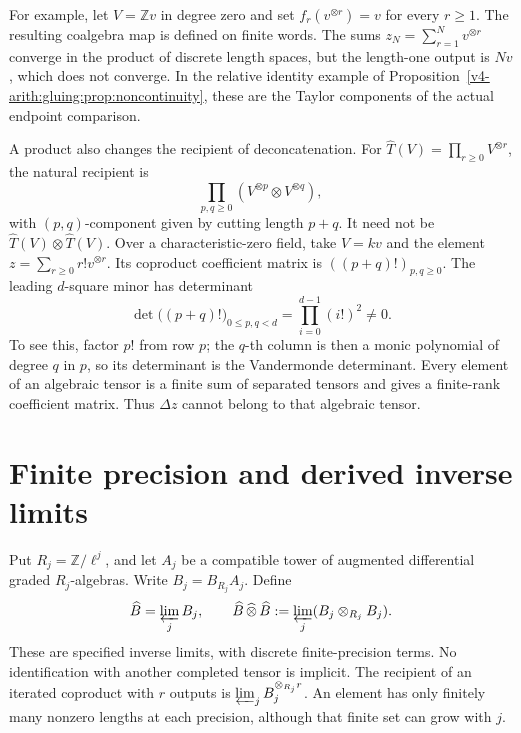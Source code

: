 For example, let \(V=\mathbb Z v\) in degree zero and set
\(f_r(v^{\otimes r})=v\) for every \(r\geq1\). The resulting
coalgebra map is defined on finite words. The sums
\(z_N=\sum_{r=1}^Nv^{\otimes r}\) converge in the product of
discrete length spaces, but the length-one output is \(Nv\),
which does not converge. In the relative identity example of
Proposition~\ref{v4-arith:gluing:prop:noncontinuity}, these are
the Taylor components of the actual endpoint comparison.

A product also changes the recipient of deconcatenation. For
\(\widehat T(V)=\prod_{r\geq0}V^{\otimes r}\), the natural
recipient is
\[
 \prod_{p,q\geq0}(V^{\otimes p}\otimes V^{\otimes q}),
\]
with \((p,q)\)-component given by cutting length \(p+q\). It
need not be \(\widehat T(V)\otimes\widehat T(V)\).
Over a characteristic-zero field, take \(V=kv\) and the element
\(z=\sum_{r\geq0}r!v^{\otimes r}\). Its coproduct coefficient
matrix is \(((p+q)!)_{p,q\geq0}\). The leading \(d\)-square
minor has determinant
\[
 \det\bigl((p+q)!\bigr)_{0\leq p,q<d}
          =\prod_{i=0}^{d-1}(i!)^2\ne0.
\]
To see this, factor \(p!\) from row \(p\); the \(q\)-th column
is then a monic polynomial of degree \(q\) in \(p\), so its
determinant is the Vandermonde determinant. Every element of an
algebraic tensor is a finite sum of separated tensors and gives
a finite-rank coefficient matrix. Thus \(\Delta z\) cannot
belong to that algebraic tensor.

\section{Finite precision and derived inverse limits}
\label{v4-sec:bar-adic-completion}

Put \(R_j=\mathbb Z/\ell^j\), and let \(A_j\) be a compatible
tower of augmented differential graded \(R_j\)-algebras. Write
\(B_j=B_{R_j}A_j\). Define
\begin{equation}\label{v4-eq:bar-adic-completion}
 \widehat B=\varprojlim_jB_j,
 \qquad
 \widehat B\,\widehat\otimes\,\widehat B
       :=\varprojlim_j(B_j\otimes_{R_j}B_j).
\end{equation}
These are specified inverse limits, with discrete finite-precision
terms. No identification with another completed tensor is implicit.
The recipient of an iterated coproduct with \(r\) outputs is
\(\varprojlim_j B_j^{\otimes_{R_j}r}\).
An element has only finitely many nonzero lengths at each
precision, although that finite set can grow with \(j\).

